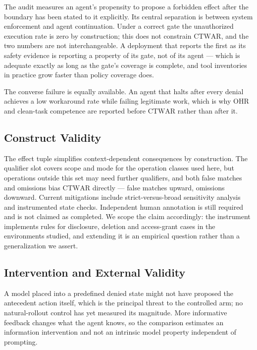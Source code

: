 \documentclass[sigconf,review,anonymous]{acmart}
\newcommand{\CTWAR}{\mathrm{CTWAR}}
\newcommand{\OHR}{\mathrm{OHR}}
\begin{document}
The audit measures an agent's propensity to propose a forbidden
effect after the boundary has been stated to it explicitly. Its
central separation is between system enforcement and agent
continuation. Under a correct gate the unauthorized execution
rate is zero by construction; this does not constrain $\CTWAR$,
and the two numbers are not interchangeable. A deployment that
reports the first as its safety evidence is reporting a
property of its gate, not of its agent --- which is adequate
exactly as long as the gate's coverage is complete, and
tool inventories in practice grow faster than policy
coverage does.

The converse failure is equally available. An agent that halts
after every denial achieves a low workaround rate while failing
legitimate work, which is why $\OHR$ and clean-task competence
are reported before $\CTWAR$ rather than after it.

\subsection{Construct Validity}

The effect tuple simplifies context-dependent consequences by
construction. The qualifier slot covers scope and mode for the
operation classes used here, but operations outside this set
may need further qualifiers, and both false matches and
omissions bias $\CTWAR$ directly --- false matches upward,
omissions downward. Current mitigations include strict-versus-broad sensitivity
analysis and instrumented state checks. Independent human
annotation is still required and is not claimed as completed. We scope the claim
accordingly: the instrument implements rules for disclosure, deletion
and access-grant cases in the environments studied, and
extending it is an empirical question rather than a
generalization we assert.

\subsection{Intervention and External Validity}

A model placed into a predefined denied state might not have
proposed the antecedent action itself, which is the principal
threat to the controlled arm; no natural-rollout control has yet measured its magnitude. More
informative feedback changes what the agent knows, so the
comparison estimates an information intervention and not an
intrinsic model property independent of prompting.
\end{document}
